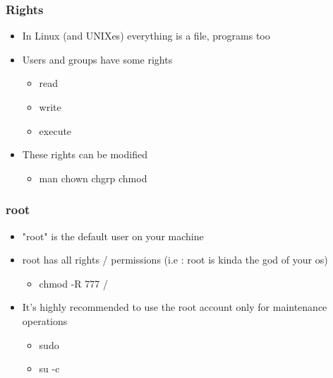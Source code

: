 \begin{frame}
    \frametitle{Rights}
    \begin{itemize}
	\item In Linux (and UNIXes) everything is a file, programs too
	\item Users and groups have some rights
	\begin{itemize}
	    \item read
	    \item write
	    \item execute
	\end{itemize}
	\item These rights can be modified
	\begin{itemize}
	    \item man chown chgrp chmod
	\end{itemize}
    \end{itemize}
\end{frame}


\begin{frame}
    \frametitle{root}
    \begin{itemize}
	\item "root" is the default user on your machine
	\item root has all rights / permissions (i.e : root is kinda the god of your os)
	    \begin{itemize}
		\item chmod -R 777 / 
	    \end{itemize}
	\item It's highly recommended to use the root account only for maintenance operations
	\begin{itemize}
	    \item sudo
	    \item su -c
	\end{itemize}
    \end{itemize}
\end{frame}
